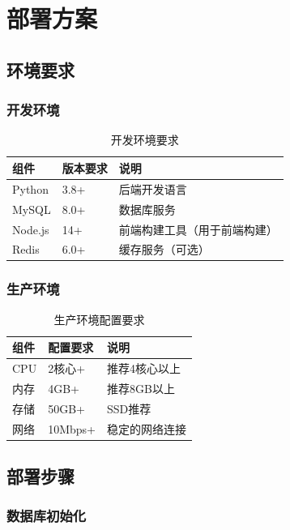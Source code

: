 \documentclass[a4paper]{article}
\begin{document}
\section{部署方案}

\subsection{环境要求}

\subsubsection{开发环境}

\begin{table}[H]
\centering
\begin{tabular}{|l|l|l|}
\hline
\textbf{组件} & \textbf{版本要求} & \textbf{说明} \\
\hline
Python & 3.8+ & 后端开发语言 \\
\hline
MySQL & 8.0+ & 数据库服务 \\
\hline
Node.js & 14+ & 前端构建工具（用于前端构建） \\
\hline
Redis & 6.0+ & 缓存服务（可选） \\
\hline
\end{tabular}
\caption{开发环境要求}
\end{table}

\subsubsection{生产环境}

\begin{table}[H]
\centering
\begin{tabular}{|l|l|l|}
\hline
\textbf{组件} & \textbf{配置要求} & \textbf{说明} \\
\hline
CPU & 2核心+ & 推荐4核心以上 \\
\hline
内存 & 4GB+ & 推荐8GB以上 \\
\hline
存储 & 50GB+ & SSD推荐 \\
\hline
网络 & 10Mbps+ & 稳定的网络连接 \\
\hline
\end{tabular}
\caption{生产环境配置要求}
\end{table}

\subsection{部署步骤}

\subsubsection{数据库初始化}
\end{document}
